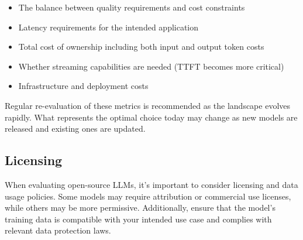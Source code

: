 \begin{itemize}
    \item The balance between quality requirements and cost constraints
    \item Latency requirements for the intended application
    \item Total cost of ownership including both input and output token costs
    \item Whether streaming capabilities are needed (TTFT becomes more critical)
    \item Infrastructure and deployment costs
\end{itemize}

Regular re-evaluation of these metrics is recommended as the landscape evolves rapidly. What represents the optimal choice today may change as new models are released and existing ones are updated.

\subsection{Licensing}

When evaluating open-source LLMs, it's important to consider licensing and data usage policies. Some models may require attribution or commercial use licenses, while others may be more permissive. Additionally, ensure that the model's training data is compatible with your intended use case and complies with relevant data protection laws.

